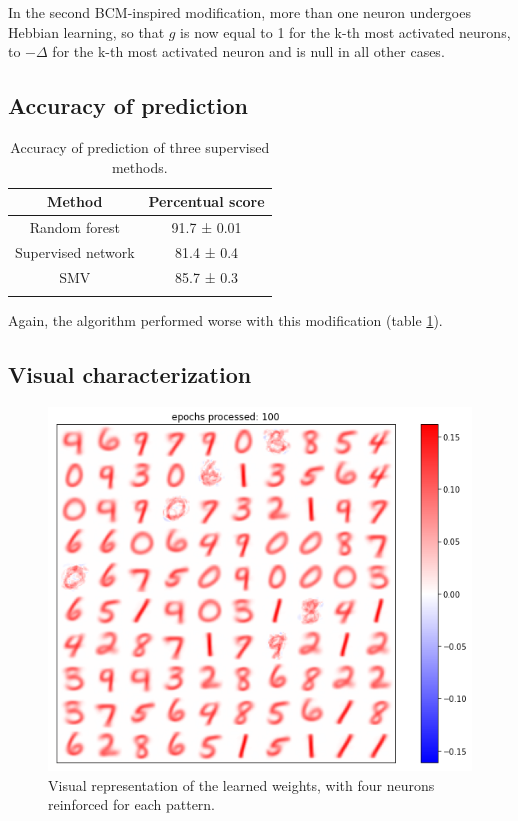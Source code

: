 \documentclass[a4paper]{report}
\begin{document}
In the second BCM-inspired modification, more than one neuron undergoes Hebbian learning, so that $g$ is now equal to 1 for the k-th most activated neurons, to $-\Delta$ for the k-th most activated neuron and is null in all other cases.

\subsection{Accuracy of prediction}

\begin{table}[hb!]
  \begin{center}
    \caption{Accuracy of prediction of three supervised methods.}
    \begin{tabular}{c|c} %
      \textbf{Method} & \textbf{Percentual score}\\
      \hline
      Random forest & 91.7  ± 0.01\\
      Supervised network & 81.4 ± 0.4\\
      SMV & 85.7 ± 0.3\\
      \label{4tab}
    \end{tabular}
  \end{center}
\end{table}

Again, the algorithm performed worse with this modification (table \ref{4tab}).

\subsection{Visual characterization}

\begin{figure} [H]
\centering
\includegraphics [width=12cm ] {h/quattrocinque.png}
\caption{Visual representation of the learned weights, with four neurons reinforced for each pattern.}
\label{multiple}
\end{figure}
\end{document}
